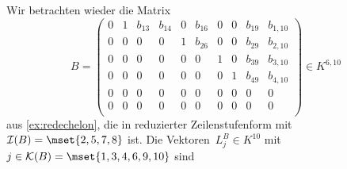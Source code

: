 \documentclass[a4paper]{article}
\begin{document}
\begin{example}
    Wir betrachten wieder die Matrix
    \begin{equation*}
        B = \begin{pmatrix}
            0 & 1 & b_{13} & b_{14} & 0 & b_{16} & 0 & 0 & b_{19} & b_{1, 10} \\
            0 & 0 & 0      & 0      & 1 & b_{26} & 0 & 0 & b_{29} & b_{2, 10} \\
            0 & 0 & 0      & 0      & 0 & 0      & 1 & 0 & b_{39} & b_{3, 10} \\
            0 & 0 & 0      & 0      & 0 & 0      & 0 & 1 & b_{49} & b_{4, 10} \\
            0 & 0 & 0      & 0      & 0 & 0      & 0 & 0 & 0      & 0         \\
            0 & 0 & 0      & 0      & 0 & 0      & 0 & 0 & 0      & 0         \\
        \end{pmatrix} \in K^{6, 10}
    \end{equation*}
    aus \cref{ex:redechelon}, die in reduzierter Zeilenstufenform mit $\mathcal{I}(B) = \mset{2, 5, 7, 8}$ ist. Die Vektoren~$L_j^B \in K^{10}$ mit $j \in \mathcal{K}(B) = \mset{1, 3, 4, 6, 9, 10}$ sind
    \begin{align*}

\end{align*}
\end{example}
\end{document}
